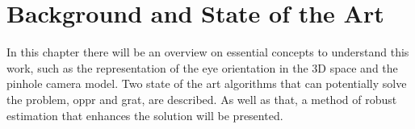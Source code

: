 
\chapter{Background and State of the Art}
\label{backgroundandsota}

In this chapter there will be an overview on essential concepts to understand this work, such as the representation of the eye orientation in the 3D space and the pinhole camera model. Two state of the art algorithms that can potentially solve the problem,  \acrlong{oppr} and  \acrlong{grat}, are described. As well as that, a method of robust estimation that enhances the solution will be presented.



%



